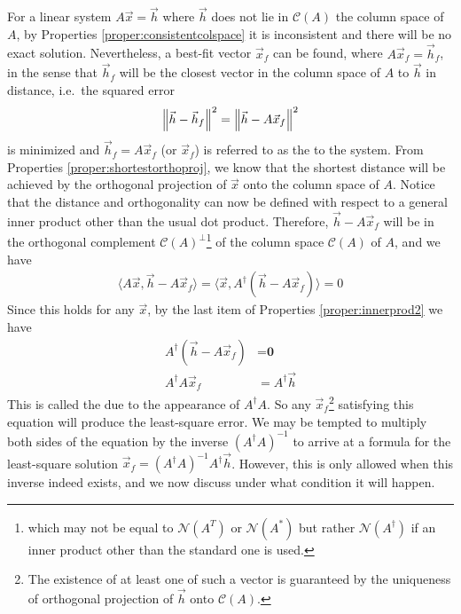 For a linear system $A\vec{x} = \vec{h}$ where $\vec{h}$ does not lie in $\mathcal{C}(A)$ the column space of $A$, by Properties \ref{proper:consistentcolspace} it is inconsistent and there will be no exact solution. Nevertheless, a best-fit vector $\vec{x}_f$ can be found, where $A\vec{x}_f = \vec{h}_f$, in the sense that $\vec{h}_f$ will be the closest vector in the column space of $A$ to $\vec{h}$ in distance, i.e.\ the squared error
\begin{align*}
\norm{\vec{h}-\vec{h}_f}^2 = \norm{\vec{h}-A\vec{x}_f}^2    
\end{align*}
is minimized and $\vec{h}_f = A\vec{x}_f$ (or $\vec{x}_f$) is referred to as the  to the system. From Properties \ref{proper:shortestorthoproj}, we know that the shortest distance will be achieved by the orthogonal projection of $\vec{x}$ onto the column space of $A$. Notice that the distance and orthogonality can now be defined with respect to a general inner product other than the usual dot product. Therefore, $\vec{h}-A\vec{x}_f$ will be in the orthogonal complement $\mathcal{C}(A)^\perp$\footnote{which may not be equal to $\mathcal{N}(A^T)$ or $\mathcal{N}(A^*)$ but rather $\mathcal{N}(A^\dag)$ if an inner product other than the standard one is used.} of the column space $\mathcal{C}(A)$ of $A$, and we have
\begin{align*}
\langle A\vec{x}, \vec{h}-A\vec{x}_f \rangle = \langle \vec{x}, A^\dag(\vec{h}-A\vec{x}_f) \rangle = 0 
\end{align*}
Since this holds for any $\vec{x}$, by the last item of Properties \ref{proper:innerprod2} we have
\begin{align*}
A^\dag(\vec{h}-A\vec{x}_f) &= \textbf{0} \\
A^\dag A\vec{x}_f &= A^\dag \vec{h}
\end{align*}
This is called the  due to the appearance of $A^\dag A$. So any $\vec{x}_f$\footnote{The existence of at least one of such a vector is guaranteed by the uniqueness of orthogonal projection of $\vec{h}$ onto $\mathcal{C}(A)$.} satisfying this equation will produce the least-square error. We may be tempted to multiply both sides of the equation by the inverse $(A^\dag A)^{-1}$ to arrive at a formula for the least-square solution $\vec{x}_f = (A^\dag A)^{-1}A^\dag \vec{h}$. However, this is only allowed when this inverse indeed exists, and we now discuss under what condition it will happen.\par
